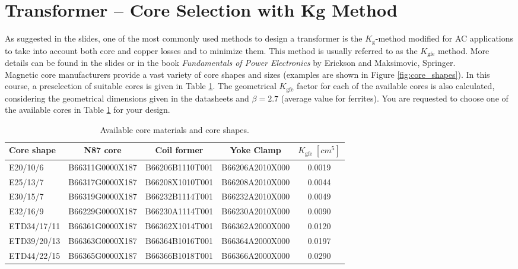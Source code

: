 \documentclass{PELsmallreport}
\begin{document}
 \hfill{}







\newpage
\section{Transformer -- Core Selection with Kg Method}


As suggested in the slides, one of the most commonly used methods to design a transformer is the $K_\mathrm{g}$-method modified for AC applications to take into account both core and copper losses and to minimize them. 
This method is usually referred to as the $K_\mathrm{gfe}$ method. 
More details can be found in the slides or in the book \textit{Fundamentals of Power Electronics} by Erickson and Maksimovic, Springer. 
\\

Magnetic core manufacturers provide a vast variety of core shapes and sizes (examples are shown in Figure \ref{fig:core_shapes}). 
In this course, a preselection of suitable cores is given in Table \ref{tab:availablematerial}. 
The geometrical $K_\mathrm{gfe}$ factor for each of the available cores is also calculated, considering the geometrical dimensions given in the datasheets and $\beta = 2.7$ (average value for ferrites).
You are requested to choose one of the available cores in Table \ref{tab:availablematerial} for your design.


\begin{table}[!h]
\centering
\caption{Available core materials and core shapes. }
\label{tab:availablematerial}
\begin{tabular}{lcccc}
	\toprule
	\textbf{Core shape} & \textbf{N87 core} & \textbf{Coil former}     & \textbf{Yoke Clamp}     &    $K_\mathrm{gfe} \; [cm^5]$  \\
	\toprule
	E20/10/6  	& B66311G0000X187 & B66206B1110T001 & B66206A2010X000 &     0.0019\\
	E25/13/7   	& B66317G0000X187 & B66208X1010T001 & B66208A2010X000 &     0.0044\\
	E30/15/7   	& B66319G0000X187 & B66232B1114T001 & B66232A2010X000 &     0.0049 \\
	E32/16/9   	& B66229G0000X187 & B66230A1114T001 & B66230A2010X000 &     0.0090\\
	ETD34/17/11 & B66361G0000X187 & B66362X1014T001 & B66362A2000X000 &     0.0120\\
	ETD39/20/13 & B66363G0000X187 & B66364B1016T001 & B66364A2000X000 &     0.0197\\
	ETD44/22/15 & B66365G0000X187 & B66366B1018T001 & B66366A2000X000 &     0.0290\\
	\bottomrule
\end{tabular}
\end{table}
\end{document}
